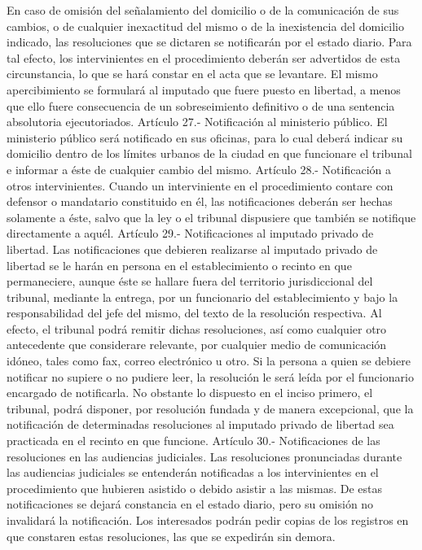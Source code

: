     En caso de omisión del señalamiento del domicilio o de la comunicación de sus cambios, o de cualquier inexactitud del mismo o de la inexistencia del domicilio indicado, las resoluciones que se dictaren se notificarán por el estado diario. Para tal efecto, los intervinientes en el procedimiento deberán ser advertidos de esta circunstancia, lo que se hará constar en el acta que se levantare.
    El mismo apercibimiento se formulará al imputado que fuere puesto en libertad, a menos que ello fuere consecuencia de un sobreseimiento definitivo o de una sentencia absolutoria ejecutoriados.
    Artículo 27.- Notificación al ministerio público. El ministerio público será notificado en sus oficinas, para lo cual deberá indicar su domicilio dentro de los límites urbanos de la ciudad en que funcionare el tribunal e informar a éste de cualquier cambio del mismo.
    Artículo 28.- Notificación a otros intervinientes. Cuando un interviniente en el procedimiento contare con defensor o mandatario constituido en él, las notificaciones deberán ser hechas solamente a éste, salvo que la ley o el tribunal dispusiere que también se notifique directamente a aquél.
    Artículo 29.- Notificaciones al imputado privado de libertad. Las notificaciones que debieren realizarse al imputado privado de libertad se le harán en persona en el establecimiento o recinto en que permaneciere, aunque éste se hallare fuera del territorio jurisdiccional del tribunal, mediante la entrega, por un funcionario del establecimiento y bajo la responsabilidad del jefe del mismo, del texto de la resolución respectiva. Al efecto, el tribunal podrá remitir dichas resoluciones, así como cualquier otro antecedente que considerare relevante, por cualquier medio de comunicación idóneo, tales como fax, correo electrónico u otro.
    Si la persona a quien se debiere notificar no supiere o no pudiere leer, la resolución le será leída por el funcionario encargado de notificarla.
    No obstante lo dispuesto en el inciso primero, el tribunal, podrá disponer, por resolución fundada y de manera excepcional, que la notificación de determinadas resoluciones al imputado privado de libertad sea practicada en el recinto en que funcione.
    Artículo 30.- Notificaciones de las resoluciones en las audiencias judiciales. Las resoluciones pronunciadas durante las audiencias judiciales se entenderán notificadas a los intervinientes en el procedimiento que hubieren asistido o debido asistir a las mismas. De estas notificaciones se dejará constancia en el estado diario, pero su omisión no invalidará la notificación.
    Los interesados podrán pedir copias de los registros en que constaren estas resoluciones, las que se expedirán sin demora.
